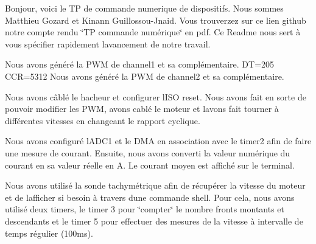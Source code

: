Bonjour, voici le TP de commande numerique de dispositifs. Nous sommes Matthieu Gozard et Kinann Guillossou-\/\+Jnaid. Vous trouverzez sur ce lien github notre compte rendu \char`\"{}\+TP commande numérique\char`\"{} en pdf. Ce Readme nous sert à vous spécifier rapidement l\textquotesingle{}avancement de notre travail.

Nous avons généré la PWM de channel1 et sa complémentaire. DT=205 CCR=5312 Nous avons généré la PWM de channel2 et sa complémentaire.

Nous avons câblé le hacheur et configurer l\textquotesingle{}ISO reset. Nous avons fait en sorte de pouvoir modifier les PWM, avons cablé le moteur et l\textquotesingle{}avons fait tourner à différentes vitesses en changeant le rapport cyclique.

Nous avons configuré l\textquotesingle{}ADC1 et le DMA en association avec le timer2 afin de faire une mesure de courant. Ensuite, nous avons converti la valeur numérique du courant en sa valeur réelle en A. Le courant moyen est affiché sur le terminal.

Nous avons utilisé la sonde tachymétrique afin de récupérer la vitesse du moteur et de l\textquotesingle{}afficher si besoin à travers d\textquotesingle{}une commande shell. Pour cela, nous avons utilisé deux timers, le timer 3 pour \char`\"{}compter\char`\"{} le nombre fronts montants et descendants et le timer 5 pour effectuer des mesures de la vitesse à intervalle de temps régulier (100ms). 